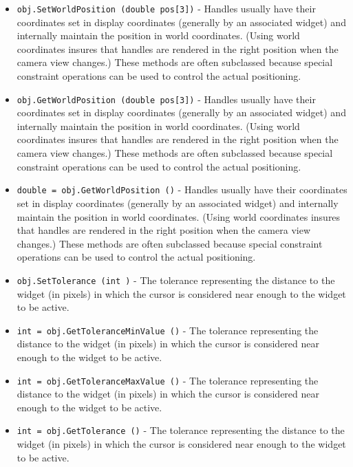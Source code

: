 \begin{itemize}
\item  \verb|obj.SetWorldPosition (double pos[3])| -  Handles usually have their coordinates set in display coordinates
 (generally by an associated widget) and internally maintain the position
 in world coordinates. (Using world coordinates insures that handles are
 rendered in the right position when the camera view changes.) These
 methods are often subclassed because special constraint operations can
 be used to control the actual positioning.

\item  \verb|obj.GetWorldPosition (double pos[3])| -  Handles usually have their coordinates set in display coordinates
 (generally by an associated widget) and internally maintain the position
 in world coordinates. (Using world coordinates insures that handles are
 rendered in the right position when the camera view changes.) These
 methods are often subclassed because special constraint operations can
 be used to control the actual positioning.

\item  \verb|double = obj.GetWorldPosition ()| -  Handles usually have their coordinates set in display coordinates
 (generally by an associated widget) and internally maintain the position
 in world coordinates. (Using world coordinates insures that handles are
 rendered in the right position when the camera view changes.) These
 methods are often subclassed because special constraint operations can
 be used to control the actual positioning.

\item  \verb|obj.SetTolerance (int )| -  The tolerance representing the distance to the widget (in pixels)
 in which the cursor is considered near enough to the widget to
 be active.

\item  \verb|int = obj.GetToleranceMinValue ()| -  The tolerance representing the distance to the widget (in pixels)
 in which the cursor is considered near enough to the widget to
 be active.

\item  \verb|int = obj.GetToleranceMaxValue ()| -  The tolerance representing the distance to the widget (in pixels)
 in which the cursor is considered near enough to the widget to
 be active.

\item  \verb|int = obj.GetTolerance ()| -  The tolerance representing the distance to the widget (in pixels)
 in which the cursor is considered near enough to the widget to
 be active.


\end{itemize}
